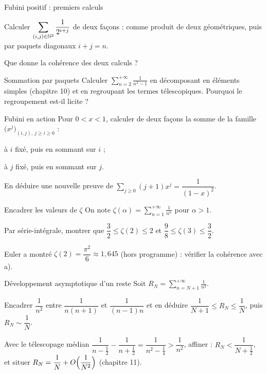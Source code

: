 \begin{exercice}[2]{Fubini positif : premiers calculs}
\begin{questions}
  \item Calculer $\displaystyle\sum_{(i,j)\in\mathbb{N}^{2}}\frac{1}{2^{i+j}}$ de
    deux façons : comme produit de deux géométriques, puis par paquets
    diagonaux $i+j=n$.
  \item Que donne la cohérence des deux calculs ?
\end{questions}
\end{exercice}

\begin{exercice}[2]{Sommation par paquets}
Calculer $\displaystyle\sum_{n=2}^{+\infty}\frac{1}{n^{2}-1}$ en
décomposant en éléments simples (chapitre 10) et en regroupant les termes
télescopiques. Pourquoi le regroupement est-il licite ?
\end{exercice}

\begin{exercice}[2]{Fubini en action}
Pour $0<x<1$, calculer de deux façons la somme de la famille
$\bigl(x^{j}\bigr)_{(i,j),\ j\geqslant i\geqslant0}$ :
\begin{questions}
  \item à $i$ fixé, puis en sommant sur $i$ ;
  \item à $j$ fixé, puis en sommant sur $j$.
\end{questions}
En déduire une nouvelle preuve de
$\sum_{j\geqslant0}(j+1)x^{j}=\dfrac{1}{(1-x)^{2}}$.
\end{exercice}


\begin{exercice}[3]{Encadrer les valeurs de $\zeta$}
On note $\zeta(\alpha)=\displaystyle\sum_{n=1}^{+\infty}\frac{1}{n^{\alpha}}$
pour $\alpha>1$.
\begin{questions}
  \item Par série-intégrale, montrer que
    $\dfrac32\leqslant\zeta(2)\leqslant2$ et
    $\dfrac98\leqslant\zeta(3)\leqslant\dfrac32$.
  \item Euler a montré $\zeta(2)=\dfrac{\pi^{2}}{6}\approx1{,}645$ (hors
    programme) : vérifier la cohérence avec a).
\end{questions}
\end{exercice}

\begin{exercice}[3]{Développement asymptotique d'un reste}
Soit $R_N=\displaystyle\sum_{n=N+1}^{+\infty}\frac{1}{n^{2}}$.
\begin{questions}
  \item Encadrer $\dfrac{1}{n^{2}}$ entre $\dfrac{1}{n(n+1)}$ et
    $\dfrac{1}{(n-1)n}$ et en déduire
    $\dfrac{1}{N+1}\leqslant R_N\leqslant\dfrac1N$, puis
    $R_N\sim\dfrac1N$.
  \item Avec le télescopage médian
    $\dfrac{1}{n-\frac12}-\dfrac{1}{n+\frac12}=\dfrac{1}{n^{2}-\frac14}
    >\dfrac{1}{n^{2}}$, affiner : $R_N<\dfrac{1}{N+\frac12}$, et situer
    $R_N=\dfrac1N+O\Bigl(\dfrac{1}{N^{2}}\Bigr)$ (chapitre 11).
\end{questions}
\end{exercice}

